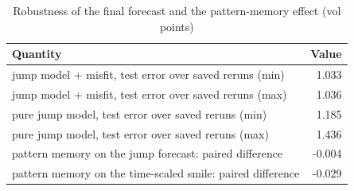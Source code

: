 \begin{table}[ht]
\centering
\small
\caption{Robustness of the final forecast and the pattern-memory effect (vol points)}
\begin{tabular}{lr}
\toprule
Quantity & Value \\
\midrule
jump model + misfit, test error over saved reruns (min) & 1.033 \\
jump model + misfit, test error over saved reruns (max) & 1.036 \\
pure jump model, test error over saved reruns (min) & 1.185 \\
pure jump model, test error over saved reruns (max) & 1.436 \\
pattern memory on the jump forecast: paired difference & -0.004 \\
pattern memory on the time-scaled smile: paired difference & -0.029 \\
\bottomrule
\end{tabular}
\par{}
\end{table}
